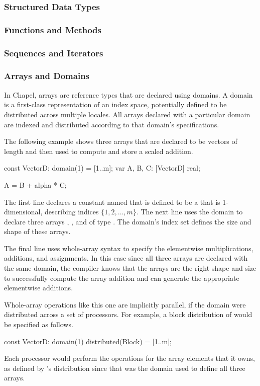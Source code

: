 \subsubsection{Structured Data Types}
\label{Structured_Data_Types}

\subsubsection{Functions and Methods}
\label{Functions_and_Methods}

\subsubsection{Sequences and Iterators}
\label{Sequences_and_Iterators}


\subsubsection{Arrays and Domains}
\label{Arrays_and_Domains}

In Chapel, arrays are reference types that are declared using domains.
A domain is a first-class representation of an index space, potentially 
defined to be distributed across multiple locales.   All arrays
declared with a particular domain are indexed and distributed according 
to that domain's specifications.  

The following example shows three arrays that are declared to be
vectors of length  and then used to compute and store a 
scaled addition.
\begin{chapel}
const VectorD: domain(1) = [1..m];
var A, B, C: [VectorD] real;

A = B + alpha * C;
\end{chapel}
The first line declares a constant named  that
is defined to be a  that is  
1-dimensional, describing indices $\{ 1, 2, \ldots, m \}$.
The next line uses the  domain to declare three
arrays , , and  of type .  The
domain's index set defines the size and shape of these arrays. 

The final line uses whole-array syntax to specify the elementwise 
multiplications, additions, and assignments.  In this case since
all three arrays are declared with the same domain, the compiler
knows that the arrays are the right shape and size to successfully
compute the array addition and can generate the appropriate elementwise
additions.

Whole-array operations like this one are implicitly parallel, if the 
domain were distributed across a set of processors.  For example, 
a block distribution of  would be specified as follows.    
\begin{chapel}
const VectorD: domain(1) distributed(Block) = [1..m];
\end{chapel}
Each processor would perform the operations for the array elements that it owns, 
as defined by 's distribution since that was the domain
used to define all three arrays.

